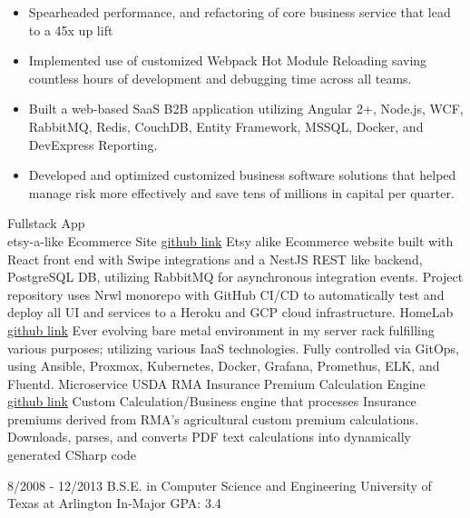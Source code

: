 \documentclass[9pt]{basecv} %
\begin{document}
\begin{entrylist}
{\begin{itemize}[noitemsep,topsep=0pt,parsep=0pt,partopsep=0pt, leftmargin=-1pt]
            \item Spearheaded performance, and refactoring of core business service that lead to a 45x up lift
            \item Implemented use of customized Webpack Hot Module Reloading saving countless hours of development
                  and debugging time across all teams.
            \item Built a web-based SaaS B2B application utilizing Angular 2+, Node.js, WCF, RabbitMQ, Redis, CouchDB,
                  Entity Framework, MSSQL, Docker, and DevExpress Reporting.
            \item Developed and optimized customized business software solutions that helped manage risk more
                  effectively and save tens of millions in capital per quarter.
        \end{itemize}
    }
\end{entrylist}
\begin{entrylist}
    \entry
    {Fullstack App\\\footnotesize{etsy-a-like}}
    {Ecommerce Site}
    {\href{https://github.com/will-white/ecommorg}{github link}}
    {Etsy alike Ecommerce website built with React front end with Swipe integrations and a NestJS REST like backend, PostgreSQL DB, utilizing RabbitMQ for asynchronous integration events. Project repository uses Nrwl monorepo with GitHub CI/CD to automatically test and deploy all UI and services to a Heroku and GCP cloud infrastructure.}
    \entry
    {}
    {HomeLab}
    {\href{https://github.com/will-white/home-cluster}{github link}}
    {Ever evolving bare metal environment in my server rack fulfilling various purposes; utilizing various IaaS technologies. Fully controlled via GitOps, using Ansible, Proxmox, Kubernetes, Docker, Grafana, Promethus, ELK, and Fluentd.}
    \entry
    {Microservice}
    {USDA RMA Insurance Premium Calculation Engine}
    {\href{https://github.com/will-white/RMA}{github link}}
    {Custom Calculation/Business engine that processes Insurance premiums derived from RMA's agricultural custom premium calculations. Downloads, parses, and converts PDF text calculations into dynamically generated CSharp code}
\end{entrylist}
\begin{entrylist}
    \entry
    {8/2008 - 12/2013}
    {B.S.E. in Computer Science and Engineering}
    {University of Texas at Arlington}
    {In-Major GPA: 3.4}
\end{entrylist}
\end{document}
